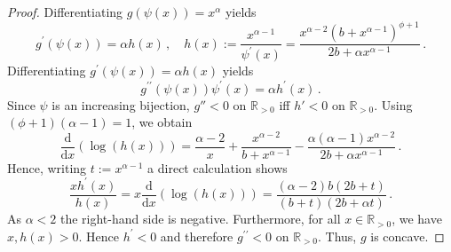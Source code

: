 \documentclass{article}
\newcommand{\R}{\mathbb{R}}
\newcommand{\Rpp}{\R_{>0}}
\newcommand{\lb}{\left(} %
\newcommand{\rb}{\right)} %
\newcommand{\br}[1]{\lb #1 \rb} %
\newcommand{\pr}{^\prime}
\newcommand{\prr}{^{\prime\prime}}
\newcommand{\eqcm}{\,,} %
\newcommand{\eqfs}{\,.}
\newcommand{\dl}{\mathrm{d}} %
\begin{document}
\begin{proof}
    \underline{} Differentiating $g(\psi(x))=x^\alpha$ yields
    \begin{equation}
        g\pr(\psi(x))
        =
        \alpha h(x)
        \eqcm\quad
        h(x)
        :=
        \frac{x^{\alpha-1}}{\psi\pr(x)}
        =
        \frac{x^{\alpha-2}(b+x^{\alpha-1})^{\phi+1}}{2b+\alpha x^{\alpha-1}}
        \eqfs
    \end{equation}
    Differentiating $g\pr(\psi(x)) = \alpha h(x)$ yields
    \begin{equation}
        g\prr(\psi(x))\psi\pr(x)
        =
        \alpha h\pr(x)
        \eqfs
    \end{equation}
    Since $\psi$ is an increasing bijection, $g''<0$ on $\Rpp$ iff $h'<0$ on $\Rpp$.
    Using $(\phi+1)(\alpha-1) = 1$, we obtain
    \begin{equation}
        \frac{\dl}{\dl x}\br{\log(h(x))}
        =
        \frac{\alpha-2}{x}+\frac{x^{\alpha-2}}{b+x^{\alpha-1}}-\frac{\alpha(\alpha-1)x^{\alpha-2}}{2b+\alpha x^{\alpha-1}}
        \eqfs
    \end{equation}
    Hence, writing $t:=x^{\alpha-1}$ a direct calculation shows
    \begin{equation}
        \frac{x h\pr(x)}{h(x)}
        =
        x \frac{\dl}{\dl x}\br{\log(h(x))}
        =
        \frac{(\alpha-2) b (2b+t)}{(b+t)(2b+\alpha t)}
        \eqfs
    \end{equation}
    As $\alpha<2$ the right-hand side is negative. Furthermore, for all $x\in\Rpp$, we have $x, h(x) > 0$. Hence $h\pr <0$ and therefore $g\prr < 0$ on $\Rpp$. Thus, $g$ is concave.
    

\end{proof}
\end{document}

